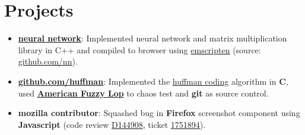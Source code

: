 \section{Projects}

\begin{itemize}[leftmargin=*]
    \item {
        \href{http://www.altf.ca/nn/main.html}{\textbf{neural network}}: Implemented neural network and matrix multiplication library in C++ and compiled to browser using \href{https://emscripten.org/index.html}{emscripten} (source: \href{https://github.com/Haximilian/nn}{github.com/nn}).
    }
    \item {
        \href{https://github.com/Haximilian/huffman}{\textbf{github.com/huffman}}: Implemented the \href{https://en.wikipedia.org/wiki/Huffman_coding}{huffman coding} algorithm in \textbf{C}, used \href{https://lcamtuf.coredump.cx/afl/}{\textbf{American Fuzzy Lop}} to chaos test and \textbf{git} as source control.
    }
    \item {
        \textbf{mozilla contributor}: Squashed bug in \textbf{Firefox} screenshot component using \textbf{Javascript} (code review \href{https://phabricator.services.mozilla.com/D144908}{D144908}, ticket \href{https://bugzilla.mozilla.org/show_bug.cgi?id=1751894}{1751894}).
    }
\end{itemize}